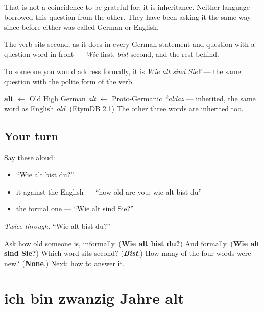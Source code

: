 That is not a coincidence to be grateful for; it is inheritance. Neither language borrowed this question from the other. They have been asking it the same way since before either was called German or English.

The verb sits second, as it does in every German statement and question with a question word in front — \emph{Wie} first, \emph{bist} second, and the rest behind.

To someone you would address formally, it is \emph{Wie alt sind Sie?} — the same question with the polite form of the verb.

\begin{cousinweb}
\textbf{alt} $\leftarrow$ Old High German \emph{alt} $\leftarrow$ Proto-Germanic \emph{*aldaz} — inherited, the same word as English \emph{old}. (EtymDB 2.1) The other three words are inherited too.
\end{cousinweb}

\subsection*{Your turn}
Say these aloud:

\begin{itemize}
\raggedright
  \item \textquotedblleft{}Wie alt bist du?\textquotedblright{}
  \item it against the English — \textquotedblleft{}how old are you; wie alt bist du\textquotedblright{}
  \item the formal one — \textquotedblleft{}Wie alt sind Sie?\textquotedblright{}
\end{itemize}

\emph{Twice through:} \textquotedblleft{}Wie alt bist du?\textquotedblright{}

\begin{tcolorbox}[breakable,colback=teal!4,colframe=teal!35!black,title={Before you move on}]
Ask how old someone is, informally. (\textbf{Wie alt bist du?}) And formally. (\textbf{Wie alt sind Sie?}) Which word sits second? (\emph{\textbf{Bist}}.) How many of the four words were new? (\textbf{None}.) Next: how to answer it.
\end{tcolorbox}
\section[ich bin zwanzig Jahre alt]{ich bin zwanzig Jahre alt}

\label{lesson:GE-C14-alter}



